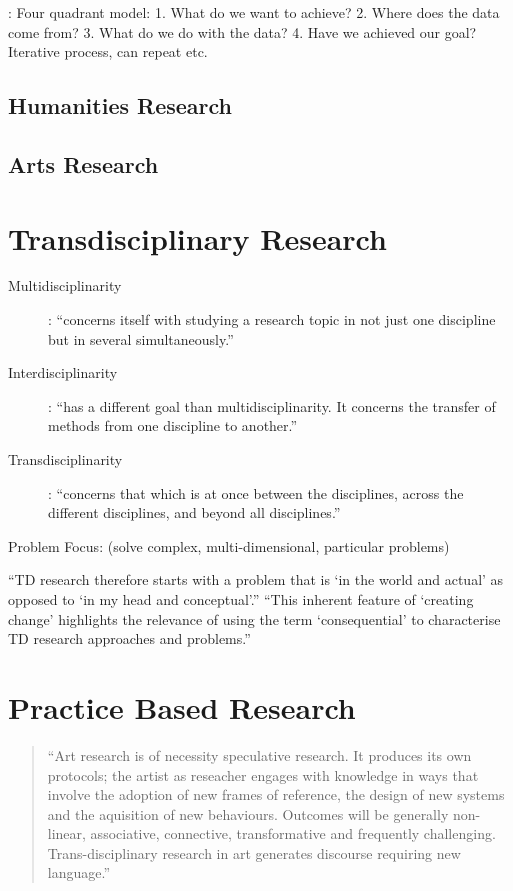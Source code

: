 \autocite{Holz2006}:
Four quadrant model:
1.	What do we want to achieve?
2.	Where does the data come from?
3.	What do we do with the data?
4.	Have we achieved our goal?
Iterative process, can repeat etc.


\subsection{Humanities Research}

\subsection{Arts Research}

\section{Transdisciplinary Research}

\begin{description}
  \item [Multidisciplinarity]:	``concerns itself with studying a research topic in not just one discipline but in several simultaneously.''
  \item [Interdisciplinarity]:	``has a different goal than multidisciplinarity. It concerns the transfer of methods from one discipline to another.''
  \item [Transdisciplinarity]:	``concerns that which is at once between the disciplines, across the different disciplines, and beyond all disciplines.''
\end{description} \autocite{Nicolescu2010}

Problem Focus: (solve complex, multi-dimensional, particular problems)

``TD research therefore starts with a problem that is `in the world and actual' as opposed to `in my head and conceptual'.'' ``This inherent feature of `creating change' highlights the relevance of using the term `consequential' to characterise TD research approaches and problems.'' \autocite{Wickson2006}



\section{Practice Based Research}


\begin{quote}
  ``Art research is of necessity speculative research. It produces its own protocols; the artist as reseacher engages with knowledge in ways that involve the adoption of new frames of reference, the design of new systems and the aquisition of new behaviours. Outcomes will be generally non-linear, associative, connective, transformative and frequently challenging. Trans-disciplinary research in art generates discourse requiring new language.''\autocite[Roy Ascott's preface in][p. v]{Candy2011}
\end{quote}

